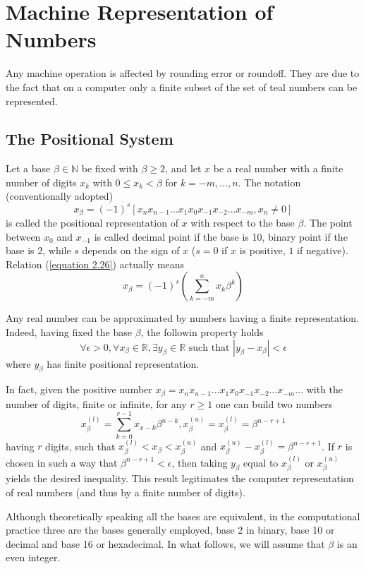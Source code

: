 \section{Machine Representation of Numbers}
Any machine operation is affected by rounding error or roundoff. They are due to the fact that on a computer only a finite subset of the set of teal numbers can be represented.

\subsection{The Positional System}
Let a base $\beta \in \mathbb{N}$ be fixed with $\beta \geq 2$, and let $x$ be a real number with a finite number of digits $x_k$ with $0 \leq x_k < \beta$ for $k = -m,...,n$. The notation (conventionally adopted)
\begin{equation}
    x_\beta = (-1)^s [x_n x_{n-1}...x_1x_0x_{-1}x_{-2}...x_{-m}, x_n \neq 0]
    \label{equation 2.26}
\end{equation}
is called the positional representation of $x$ with respect to the base $\beta$. The point between $x_0$ and $x_{-1}$ is called decimal point if the base is 10, binary point if the base is 2, while $s$ depends on the sign of $x$ ($s=0$ if $x$ is positive, $1$ if negative). Relation (\ref{equation 2.26}) actually means
\[ x_\beta = (-1)^s \left( \sum_{k=-m}^{n} x_k \beta^k \right)\]

Any real number can be approximated by numbers having a finite representation. Indeed, having fixed the base $\beta$, the followin property holds
\[ \forall \epsilon > 0, \forall x_\beta \in \mathbb{R}, \exists y_\beta \in \mathbb{R} \text{ such that } |y_\beta - x_\beta| < \epsilon\]
where $y_\beta$ has finite positional representation.

In fact, given the positive number $x_\beta = x_n x_{n-1}...x_1x_0x_{-1}x_{-2}...x_{-m}...$ with the number of digits, finite or infinite, for any $r \geq 1$ one can build two numbers
\[x_\beta^{(l)} = \sum_{k = 0}^{r-1} x_{x-k} \beta^{n-k}, x_\beta^{(u)} = x_\beta^{(l)} = \beta^{n-r+1}\]
having $r$ digits, such that $x_\beta^{(l)} < x_\beta < x_\beta^{(u)}$ and $x_\beta^{(u)} - x_\beta^{(l)} = \beta^{n-r+1}$. If $r$ is chosen in such a way that $\beta^{n-r+1} < \epsilon$, then taking $y_\beta$ equal to $x_\beta^{(l)}$ or $x_\beta^{(u)}$ yields the desired inequality. This result legitimates the computer representation of real numbers (and thus by a finite number of digits). 

Although theoretically speaking all the bases are equivalent, in the computational practice three are the bases generally employed, base 2 in binary, base 10 or decimal and base 16 or hexadecimal. In what follows, we will assume that $\beta$ is an even integer.

